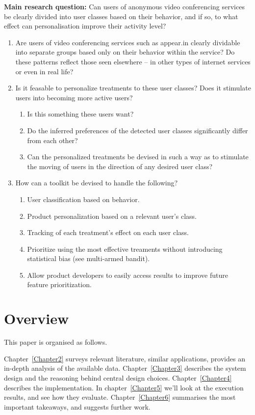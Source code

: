 \textbf{Main research question:} Can users of anonymous video conferencing services be clearly divided into user classes based on their behavior, and if so, to what effect can personalisation improve their activity level?

\begin{enumerate}
  \item Are users of video conferencing services such as appear.in clearly dividable into separate groups based only on their behavior within the service? Do these patterns reflect those seen elsewhere -- in other types of internet services or even in real life?
  \item Is it feasable to personalize treatments to these user classes? Does it stimulate users into becoming more active users?
  \begin{enumerate}
    \item Is this something these users want?
    \item Do the inferred preferences of the detected user classes significantly differ from each other?
    \item Can the personalized treatments be devised in such a way as to stimulate the moving of users in the direction of any desired user class?
  \end{enumerate}
  \item How can a toolkit be devised to handle the following?
  \begin{enumerate}
    \item User classification based on behavior.
    \item Product personalization based on a relevant user's class.
    \item Tracking of each treatment's effect on each user class.
    \item Prioritize using the most effective treaments without introducing statistical bias (see multi-armed bandit).
    \item Allow product developers to easily access results to improve future feature prioritization.
  \end{enumerate}
\end{enumerate}

\section{Overview}
\label{sec:overview}

This paper is organised as follows.

Chapter~\ref{Chapter2} surveys relevant literature, similar applications, provides an in-depth analysis of the available data.
Chapter~\ref{Chapter3} describes the system design and the reasoning behind central design choices.
Chapter~\ref{Chapter4} describes the implementation.
In chapter~\ref{Chapter5} we'll look at the execution results, and see how they evaluate.
Chapter~\ref{Chapter6} summarises the most important takeaways, and suggests further work.

